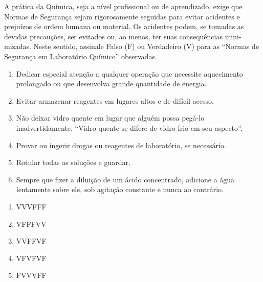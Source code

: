 A prática da Química, seja a nível profissional ou de aprendizado, exige que
Normas de Segurança sejam rigorosamente seguidas para evitar acidentes e
prejuízos de ordem humana ou material. Os acidentes podem, se tomadas as
devidas precauções, ser evitados ou, ao menos, ter suas consequências mini-
mizadas. Neste sentido, assinale Falso (F) ou Verdadeiro (V) para as “Normas
de Segurança em Laboratório Químico” observadas.

\begin{enumerate}[label = (\Roman*)]
	\item Dedicar especial atenção a qualquer operação que necessite aquecimento prolongado ou que desenvolva grande quantidade de energia.
	\item Evitar armazenar reagentes em lugares altos e de difícil acesso.
	\item Não deixar vidro quente em lugar que alguém possa pegá-lo inadvertidamente. “Vidro quente se difere de vidro frio em seu aspecto”.
	\item Provar ou ingerir drogas ou reagentes de laboratório, se necessário.
	\item Rotular todas as soluções e guardar.
	\item Sempre que fizer a diluição de um ácido concentrado, adicione a água lentamente sobre ele, sob agitação constante e nunca ao contrário.
\end{enumerate}

\begin{enumerate}[label = (\alph*)]
	\item VVVFFF
	\item VFFFVV
	\item VVFFVF
	\item VFVFVF
	\item FVVVFF
\end{enumerate}

